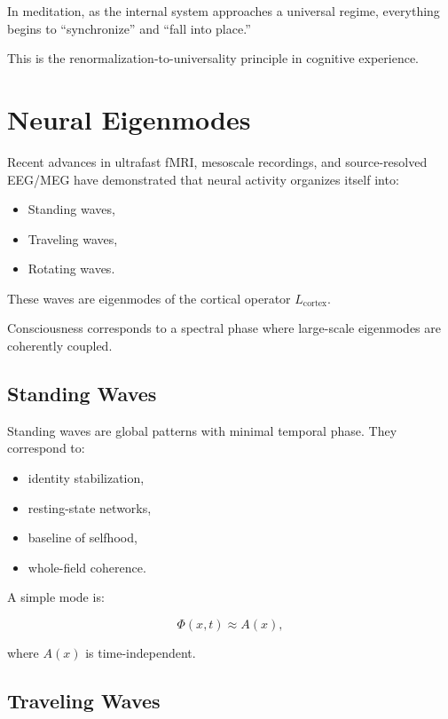 \documentclass[12pt]{article}
\begin{document}
In meditation, as the internal system approaches a universal regime, everything
begins to ``synchronize'' and ``fall into place.''

This is the renormalization-to-universality principle in cognitive experience.

\newpage


\chapter{Neural Eigenmodes}

Recent advances in ultrafast fMRI, mesoscale recordings, and source-resolved
EEG/MEG have demonstrated that neural activity organizes itself into:

\begin{itemize}
    \item Standing waves,
    \item Traveling waves,
    \item Rotating waves.
\end{itemize}

These waves are eigenmodes of the cortical operator $L_{\text{cortex}}$.

Consciousness corresponds to a spectral phase where large-scale eigenmodes are
coherently coupled.

\section{Standing Waves}

Standing waves are global patterns with minimal temporal phase.  
They correspond to:

\begin{itemize}
    \item identity stabilization,
    \item resting-state networks,
    \item baseline of selfhood,
    \item whole-field coherence.
\end{itemize}

A simple mode is:

\[
\Phi(x,t) \approx A(x),
\]

where $A(x)$ is time-independent.

\section{Traveling Waves}
\end{document}

